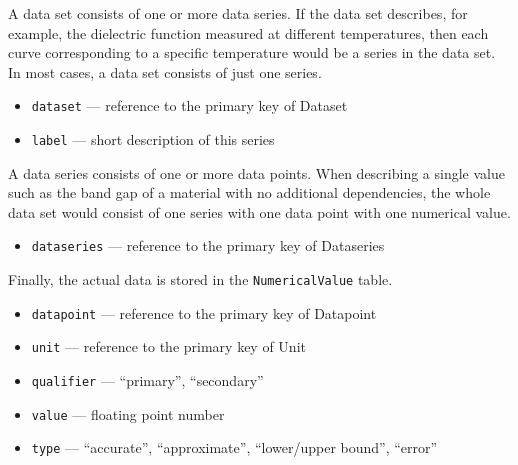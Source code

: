 \documentclass{article}
\begin{document}
A data set consists of one or more data series. If the data set describes, for example, the dielectric function measured at different temperatures, then each curve corresponding to a specific temperature would be a series in the data set. In most cases, a data set consists of just one series.
\begin{tcolorbox}[colback=green!5,colframe=green!40!black,title=Dataseries(Base)]
  \begin{itemize}
  \item \texttt{dataset} --- reference to the primary key of Dataset
  \item \texttt{label} --- short description of this series
  \end{itemize}
\end{tcolorbox}

A data series consists of one or more data points. When describing a single value such as the band gap of a material with no additional dependencies, the whole data set would consist of one series with one data point with one numerical value.
\begin{tcolorbox}[colback=green!5,colframe=green!40!black,title=Datapoint(Base)]
  \begin{itemize}
  \item \texttt{dataseries} --- reference to the primary key of Dataseries
  \end{itemize}
\end{tcolorbox}

Finally, the actual data is stored in the \texttt{NumericalValue} table.
\begin{tcolorbox}[colback=green!5,colframe=green!40!black,title=NumericalValue(Base)]
  \begin{itemize}
  \item \texttt{datapoint} --- reference to the primary key of Datapoint
  \item \texttt{unit} --- reference to the primary key of Unit
  \item \texttt{qualifier} --- ``primary'', ``secondary''
  \item \texttt{value} --- floating point number
  \item \texttt{type} --- ``accurate'', ``approximate'', ``lower/upper bound'', ``error''
  \end{itemize}
\end{tcolorbox}
\end{document}
